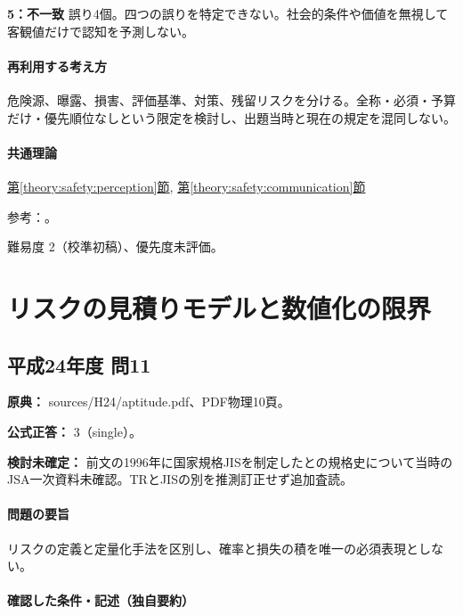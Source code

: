 \noindent\textbf{5：不一致} 誤り4個。四つの誤りを特定できない。社会的条件や価値を無視して客観値だけで認知を予測しない。\par

\paragraph{再利用する考え方} 危険源、曝露、損害、評価基準、対策、残留リスクを分ける。全称・必須・予算だけ・優先順位なしという限定を検討し、出題当時と現在の規定を混同しない。

\paragraph{共通理論} \hyperref[theory:safety:perception]{第\ref*{theory:safety:perception}節}, \hyperref[theory:safety:communication]{第\ref*{theory:safety:communication}節}

\par 参考：\cite{saf_fsc_psych,saf_fsc_glossary}。

\par 難易度 2（校準初稿）、優先度未評価。

\section{リスクの見積りモデルと数値化の限界}

\subsection{平成24年度 問11}
\label{q:h24-reg-apt-11}

\noindent\textbf{原典：} sources/H24/aptitude.pdf、PDF物理10頁。

\textbf{公式正答：} 3（single）。

\par\textbf{検討未確定：} 前文の1996年に国家規格JISを制定したとの規格史について当時のJSA一次資料未確認。TRとJISの別を推測訂正せず追加査読。

\paragraph{問題の要旨} リスクの定義と定量化手法を区別し、確率と損失の積を唯一の必須表現としない。

\paragraph{確認した条件・記述（独自要約）}\mbox{}\par


